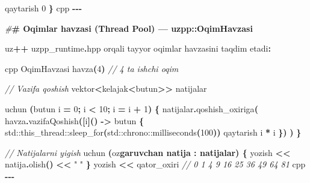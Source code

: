 \documentclass[a4paper,11pt,twoside,openright]{book}
\newenvironment{Shaded}{\begin{snugshade}}{\end{snugshade}}
\newcommand{\BuiltInTok}[1]{#1}
\newcommand{\CharTok}[1]{\textcolor[rgb]{0.31,0.60,0.02}{#1}}
\newcommand{\CommentTok}[1]{\textcolor[rgb]{0.56,0.35,0.01}{\textit{#1}}}
\newcommand{\DecValTok}[1]{\textcolor[rgb]{0.00,0.00,0.81}{#1}}
\newcommand{\ErrorTok}[1]{\textcolor[rgb]{0.64,0.00,0.00}{\textbf{#1}}}
\newcommand{\NormalTok}[1]{#1}
\newcommand{\OperatorTok}[1]{\textcolor[rgb]{0.81,0.36,0.00}{\textbf{#1}}}
\newcommand{\PreprocessorTok}[1]{\textcolor[rgb]{0.56,0.35,0.01}{\textit{#1}}}
\newcommand{\StringTok}[1]{\textcolor[rgb]{0.31,0.60,0.02}{#1}}
\begin{document}
\begin{Shaded}
\begin{Highlighting}[]
\NormalTok{    qaytarish }\DecValTok{0}
\OperatorTok{\}}
\ErrorTok{\textasciigrave{}\textasciigrave{}\textasciigrave{}}\NormalTok{cpp}
\OperatorTok{{-}{-}{-}}

\PreprocessorTok{\#}\ErrorTok{\# Oqimlar havzasi (Thread Pool) — \textasciigrave{}uzpp::OqimHavzasi\textasciigrave{}}

\NormalTok{uz}\OperatorTok{++} \ErrorTok{\textasciigrave{}}\NormalTok{uzpp\_runtime}\OperatorTok{.}\NormalTok{hpp}\ErrorTok{\textasciigrave{}}\NormalTok{ orqali tayyor oqimlar havzasini taqdim etadi}\OperatorTok{:}

\ErrorTok{\textasciigrave{}\textasciigrave{}\textasciigrave{}}\NormalTok{cpp}
\NormalTok{OqimHavzasi havza}\OperatorTok{(}\DecValTok{4}\OperatorTok{)}   \CommentTok{// 4 ta ishchi oqim}

\CommentTok{// Vazifa qo\textquotesingle{}shish}
\NormalTok{vektor}\OperatorTok{\textless{}}\NormalTok{kelajak}\OperatorTok{\textless{}}\NormalTok{butun}\OperatorTok{\textgreater{}\textgreater{}}\NormalTok{ natijalar}

\NormalTok{uchun }\OperatorTok{(}\NormalTok{butun i }\OperatorTok{=} \DecValTok{0}\OperatorTok{;}\NormalTok{ i }\OperatorTok{\textless{}} \DecValTok{10}\OperatorTok{;}\NormalTok{ i }\OperatorTok{=}\NormalTok{ i }\OperatorTok{+} \DecValTok{1}\OperatorTok{)} \OperatorTok{\{}
\NormalTok{    natijalar}\OperatorTok{.}\NormalTok{qoshish\_oxiriga}\OperatorTok{(}
\NormalTok{        havza}\OperatorTok{.}\NormalTok{vazifaQoshish}\OperatorTok{([}\NormalTok{i}\OperatorTok{]()} \OperatorTok{{-}\textgreater{}}\NormalTok{ butun }\OperatorTok{\{}
            \BuiltInTok{std::}\NormalTok{this\_thread::sleep\_for}\OperatorTok{(}\BuiltInTok{std::}\NormalTok{chrono::milliseconds}\OperatorTok{(}\DecValTok{100}\OperatorTok{))}
\NormalTok{            qaytarish i }\OperatorTok{*}\NormalTok{ i}
        \OperatorTok{\})}
    \OperatorTok{)}
\OperatorTok{\}}

\CommentTok{// Natijalarni yig\textquotesingle{}ish}
\NormalTok{uchun }\OperatorTok{(}\NormalTok{o}\CharTok{\textquotesingle{}z}\ErrorTok{garuvchan natija : natijalar) \{}
\NormalTok{    yozish }\OperatorTok{\textless{}\textless{}}\NormalTok{ natija}\OperatorTok{.}\NormalTok{olish}\OperatorTok{()} \OperatorTok{\textless{}\textless{}} \StringTok{" "}
\OperatorTok{\}}
\NormalTok{yozish }\OperatorTok{\textless{}\textless{}}\NormalTok{ qator\_oxiri   }\CommentTok{// 0 1 4 9 16 25 36 49 64 81}
\ErrorTok{\textasciigrave{}\textasciigrave{}\textasciigrave{}}\NormalTok{cpp}
\OperatorTok{{-}{-}{-}}


\end{Highlighting}
\end{Shaded}
\end{document}
